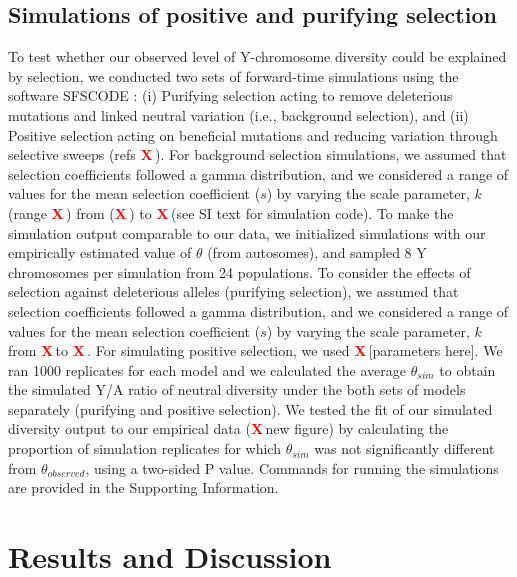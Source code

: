 \documentclass[9pt,twocolumn,twoside]{gsajnl}
\newcommand{\X}{\textcolor{red}{\bf X\,}}
\begin{document}
\subsection*{Simulations of positive and purifying selection}
To test whether our observed level of Y-chromosome diversity could be explained by selection, we conducted two sets of forward-time simulations using the software SFSCODE \citep{hernandez2008flexible}: (i) Purifying selection acting to remove deleterious mutations and linked neutral variation (i.e., background selection), and (ii) Positive selection acting on beneficial mutations and reducing variation through selective sweeps (refs \X). For background selection simulations, we assumed that selection coefficients followed a gamma distribution, and we considered a range of values for the mean selection coefficient ($s$) by varying the scale parameter, $k$ (range \X) from (\X) to \X (see SI text for simulation code).
To make the simulation output comparable to our data, we initialized simulations with our empirically estimated value of $\theta$ (from autosomes), and sampled 8 Y chromosomes per simulation from 24 populations. To consider the effects of selection against deleterious alleles (purifying selection), we assumed that selection coefficients followed a gamma distribution, and we considered a range of values for the mean selection coefficient ($s$) by varying the scale parameter, $k$ from \X to \X. For simulating positive selection, we used \X [parameters here]. We ran 1000 replicates for each model and we calculated the average $\theta_{sim}$ to obtain the simulated Y/A ratio of neutral diversity under the both sets of models separately (purifying and positive selection). We tested the fit of our simulated diversity output to our empirical data (\X new figure) by calculating the proportion of simulation replicates for which $\theta_{sim}$ was not significantly different from $\theta_{observed}$, using a two-sided P value. Commands for running the simulations are provided in the Supporting Information. 

\section*{Results and Discussion}
\end{document}
